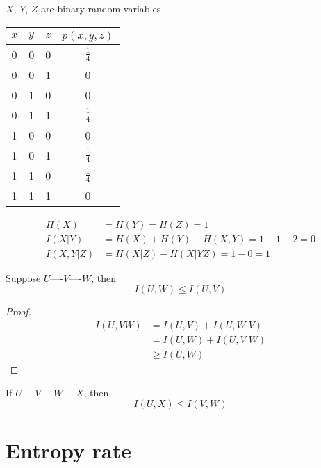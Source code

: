 \begin{example}
    $X$, $Y$, $Z$ are binary random variables
    \begin{center}
        \begin{tabular}{ccc||c}
            $x$ & $y$ & $z$ & $p(x,y,z)$\\
            \hline
            0 & 0 & 0 & $\frac{1}{4}$\\
            0 & 0 & 1 & 0\\
            0 & 1 & 0 & 0\\
            0 & 1 & 1 & $\frac{1}{4}$\\
            1 & 0 & 0 & 0\\
            1 & 0 & 1 & $\frac{1}{4}$\\
            1 & 1 & 0 & $\frac{1}{4}$\\
            1 & 1 & 1 & 0\\
        \end{tabular}
    \end{center}
    
    \[
        \begin{aligned}
            H(X) &= H(Y) = H(Z) = 1\\
            I(X\vert Y) &= H(X) + H(Y) - H(X,Y) = 1 + 1 - 2 = 0\\
            I(X,Y\vert Z) &= H(X\vert Z) - H(X \vert YZ) = 1 - 0 = 1
        \end{aligned}
    \]
\end{example}

\begin{theorem}
    Suppose $U \text{----} V \text{----} W$, then
    \[
        I(U,W) \leqslant I(U,V)    
    \]
\end{theorem}
\begin{proof}
    \[
        \begin{aligned}
            I(U, VW) &= I(U,V) + I(U,W\vert V)\\
            &= I(U,W) + I(U,V \vert W)\\
            &\geqslant I(U,W)
        \end{aligned}            
    \]
\end{proof}

\begin{corollary}
    If $U \text{----} V \text{----} W \text{----} X$, then
    \[
        I(U,X) \leqslant I(V,W)    
    \]
\end{corollary}

\section{Entropy rate}

